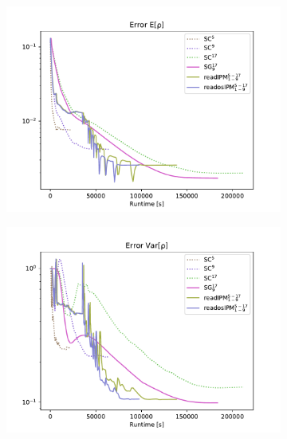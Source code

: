 \begin{figure}[h!]
\centering
	\begin{subfigure}{0.5\linewidth}
		\centering
				\includegraphics[width=\linewidth]{figs/Euler2D/L2_error_E[rho].pdf}
		\label{fig:sub1}
	\end{subfigure}%
	\begin{subfigure}{0.5\linewidth}
		\centering
				\includegraphics[width=\linewidth]{figs/Euler2D/L2_error_Var[rho].pdf}
		\label{fig:sub2}
	\end{subfigure}
	

\end{figure}
